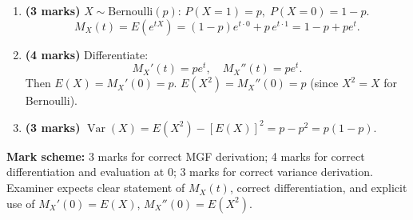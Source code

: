 \documentclass[11pt]{article}
\begin{document}
\begin{corrige}
\begin{enumerate}
\item \textbf{(3 marks)} \(X\sim\mathrm{Bernoulli}(p)\): \(P(X=1)=p,\;P(X=0)=1-p\).
\[
M_X(t)=E(e^{tX})=(1-p)e^{t\cdot0}+p\,e^{t\cdot1}=1-p+pe^t.
\]
\item \textbf{(4 marks)} Differentiate:
\[
M_X'(t)=pe^t,\quad M_X''(t)=pe^t.
\]
Then \(E(X)=M_X'(0)=p\). \(E(X^2)=M_X''(0)=p\) (since \(X^2=X\) for Bernoulli).
\item \textbf{(3 marks)} \(\operatorname{Var}(X)=E(X^2)-[E(X)]^2=p-p^2=p(1-p)\).
\end{enumerate}
\textbf{Mark scheme:} 3 marks for correct MGF derivation; 4 marks for correct differentiation and evaluation at 0; 3 marks for correct variance derivation. Examiner expects clear statement of \(M_X(t)\), correct differentiation, and explicit use of \(M_X'(0)=E(X)\), \(M_X''(0)=E(X^2)\).
\end{corrige}
\end{document}
